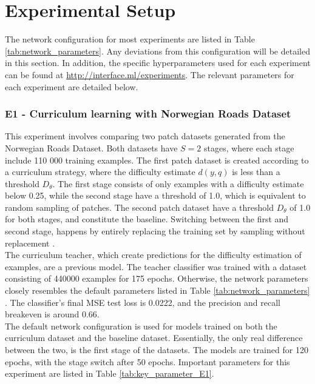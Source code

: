 \section{Experimental Setup}
\label{sec:experimentalSetup}
The network configuration for most experiments are listed in Table \ref{tab:network_parameters}. Any deviations from this configuration will be detailed in this section. In addition, the specific hyperparameters used for each experiment can be found at \url{http://interface.ml/experiments}. The relevant parameters for each experiment are detailed below.\\ 



\subsubsection{E1 - Curriculum learning with Norwegian Roads Dataset}
This experiment involves comparing two patch datasets generated from the Norwegian Roads Dataset. Both datasets have $S=2$ stages, where each stage include 110 000 training examples. The first patch dataset is created according to a curriculum strategy, where the difficulty estimate $d(y, q)$ is less than a threshold $D_\theta$. The first stage consists of only examples with a difficulty estimate below 0.25,  while the second stage have a threshold of 1.0, which is equivalent to random sampling of patches. The second patch dataset have a threshold $D_\theta$ of 1.0 for both stages, and constitute the baseline. Switching between the first and second stage, happens by entirely replacing the training set by sampling without replacement .\\

The curriculum teacher, which create predictions for the difficulty estimation of examples, are a previous model. The teacher classifier was trained with a dataset consisting of 440000 examples for 175 epochs. Otherwise, the network parameters closely resembles the default parameters listed in Table \ref{tab:network_parameters} . The classifier's final \ac{MSE} test loss is 0.0222, and the precision and recall breakeven is around 0.66. \\

The default network configuration is used for models trained on both the curriculum dataset and the baseline dataset. Essentially, the only real difference between the two, is the first stage of the datasets. The models are trained for 120 epochs, with the stage switch after 50 epochs. Important parameters for this experiment are listed in Table \ref{tab:key_parameter_E1}.\\

